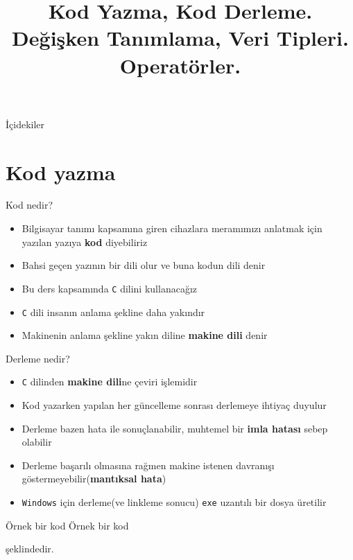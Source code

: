 
\title[Ders 1] {Kod Yazma, Kod Derleme. Değişken Tanımlama, Veri Tipleri. Operatörler.}

\frame{\titlepage}
\begin{frame}[fragile]{İçidekiler}
    \tableofcontents
\end{frame}
\section{Kod yazma}
\begin{frame}[fragile]{Kod nedir?}
    \begin{itemize}
        \item Bilgisayar tanımı kapsamına giren cihazlara meramımızı anlatmak için yazılan yazıya \textbf{kod} diyebiliriz
        \item Bahsi geçen yazının bir dili olur ve buna kodun dili denir
        \item Bu ders kapsamında \verb|C| dilini kullanacağız
        \item \verb|C| dili insanın anlama şekline daha yakındır
        \item Makinenin anlama şekline yakın diline \textbf{makine dili} denir
    \end{itemize}
\end{frame}
\begin{frame}[fragile]{Derleme nedir?}
    \begin{itemize}
        \item \verb|C| dilinden \textbf{makine dili}ne çeviri işlemidir
        \item Kod yazarken yapılan her güncelleme sonrası derlemeye ihtiyaç duyulur
        \item Derleme bazen hata ile sonuçlanabilir, muhtemel bir \textbf{imla hatası} sebep olabilir
        \item Derleme başarılı olmasına rağmen makine istenen davranışı göstermeyebilir(\textbf{mantıksal hata})
        \item \verb|Windows| için derleme(ve linkleme sonucu) \verb|exe| uzantılı bir dosya üretilir
    \end{itemize}
\end{frame}
\begin{frame}[fragile]{Örnek bir kod}
    Örnek bir kod
    
    şeklindedir.
\end{frame}
